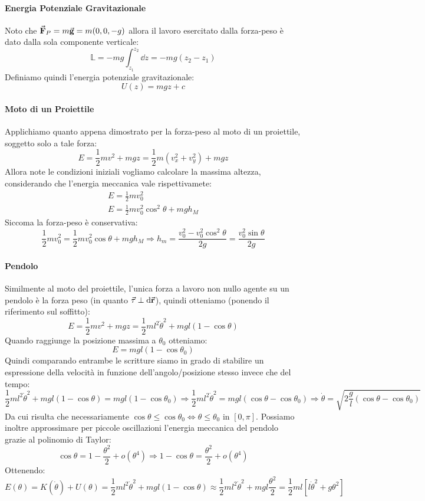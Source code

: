 \documentclass{article}
\newcommand{\then}{\ensuremath{\Rightarrow}}
\renewcommand{\r}{\va{r}}
\newcommand{\tauvt}{\va{\tau}}
\newcommand{\g}{\va{g}}
\newcommand{\F}{\va{F}}
\begin{document}
\paragraph{Energia Potenziale Gravitazionale}
Noto che $\F_P=m\g=m(0,0,-g)$ allora il lavoro esercitato dalla forza-peso è dato dalla sola componente verticale:
\[\mathbb{L}=-mg\int_{z_1}^{z_2}\dd z=-mg(z_2-z_1)\]
Definiamo quindi l'energia potenziale gravitazionale:
\[U(z)=mgz+c\]
\paragraph{Moto di un Proiettile}
Applichiamo quanto appena dimostrato per la forza-peso al moto di un proiettile, soggetto solo a tale forza:
\[E=\frac{1}{2}mv^2+mgz=\frac{1}{2}m(v_x^2+v_y^2)+mgz\]
Allora note le condizioni iniziali vogliamo calcolare la massima altezza, considerando che l'energia meccanica vale rispettivamete:
\begin{align*}
    E=\frac{1}{2}mv_0^2\\
    E=\frac{1}{2}mv_0^2\cos^2\theta+mgh_M
\end{align*}
Siccoma la forza-peso è conservativa:
\[\frac{1}{2}mv_0^2=\frac{1}{2}mv_0^2\cos\theta+mgh_M\then h_m=\frac{v_0^2-v_0^2\cos^2\theta}{2g}=\frac{v_0^2\sin\theta}{2g}\]
\paragraph{Pendolo}
Similmente al moto del proiettile, l'unica forza a lavoro non nullo agente su un pendolo è la forza peso (in quanto $\tauvt\perp\dd\r$), quindi otteniamo (ponendo il riferimento sul soffitto):
\[E=\frac{1}{2}mv^2+mgz=\frac{1}{2}ml^2\dot{\theta}^2+mgl(1-\cos\theta)\]
Quando raggiunge la posizione massima a $\theta_0$ otteniamo:
\[E=mgl(1-\cos\theta_0)\]
Quindi comparando entrambe le scritture siamo in grado di stabilire un espressione della velocità in funzione dell'angolo/posizione stesso invece che del tempo:
\[\frac{1}{2}ml^2\dot{\theta}^2+mgl(1-\cos\theta)=mgl(1-\cos\theta_0)\then\frac{1}{2}ml^2\dot{\theta}^2=mgl(\cos\theta-\cos\theta_0)\then \dot{\theta}=\sqrt{2\frac{g}{l}(\cos\theta-\cos\theta_0)} \]
Da cui risulta che necessariamente $\cos\theta\leq\cos\theta_0\iff \theta\leq\theta_0$
in $[0,\pi]$.
Possiamo inoltre approssimare per piccole oscillazioni l'energia meccanica del pendolo grazie al polinomio di Taylor:
\[\cos\theta=1-\frac{\theta^2}{2}+o(\theta^4)\then 1-\cos\theta=\frac{\theta^2}{2}+o(\theta^4)\]
Ottenendo:
\[E(\theta)=K(\dot{\theta})+U(\theta)=\frac{1}{2}ml^2\dot{\theta}^2+mgl(1-\cos\theta)\approx\frac{1}{2}ml^2\dot{\theta}^2+mgl\frac{\theta^2}{2}=\boxed{\frac{1}{2}ml[l\dot{\theta}^2+g\theta^2]}\]
\end{document}
